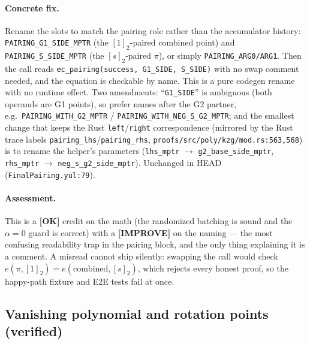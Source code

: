 \paragraph{Concrete fix.}
Rename the slots to match the pairing role rather than the
accumulator history: \texttt{PAIRING\_\allowbreak{}G1\_\allowbreak{}SIDE\_\allowbreak{}MPTR} (the
$[1]_2$-paired combined point) and \texttt{PAIRING\_\allowbreak{}S\_\allowbreak{}SIDE\_\allowbreak{}MPTR}
(the $[s]_2$-paired $\pi$), or simply
\texttt{PAIRING\_\allowbreak{}ARG0/\allowbreak{}ARG1}. Then the call reads
\texttt{ec\_\allowbreak{}pairing(success, G1\_\allowbreak{}SIDE, S\_\allowbreak{}SIDE)} with no swap
comment needed, and the equation is checkable by name. This is a
pure codegen rename with no runtime effect. Two amendments:
``\texttt{G1\_SIDE}'' is ambiguous (both operands are G1 points),
so prefer names after the G2 partner, e.g.\
\texttt{PAIRING\_\allowbreak{}WITH\_\allowbreak{}G2\_\allowbreak{}MPTR} / \texttt{PAIRING\_\allowbreak{}WITH\_\allowbreak{}NEG\_\allowbreak{}S\_\allowbreak{}G2\_\allowbreak{}MPTR};
and the smallest change that keeps the Rust \texttt{left}/\texttt{right}
correspondence (mirrored by the Rust trace labels
\texttt{pairing\_lhs}/\texttt{pairing\_rhs},
\texttt{proofs/\allowbreak{}src/\allowbreak{}poly/\allowbreak{}kzg/\allowbreak{}mod.rs:563,568}) is to rename the
helper's parameters (\texttt{lhs\_mptr} $\to$ \texttt{g2\_\allowbreak{}base\_\allowbreak{}side\_\allowbreak{}mptr},
\texttt{rhs\_mptr} $\to$ \texttt{neg\_\allowbreak{}s\_\allowbreak{}g2\_\allowbreak{}side\_\allowbreak{}mptr}).
\vstatus{OPEN} Unchanged in HEAD (\texttt{FinalPairing.yul:79}).

\paragraph{Assessment.} This is a
\textcolor{tracegreen}{\textbf{[OK]}} credit on the math (the
randomized batching is sound and the $\alpha{=}0$ guard is
correct) with a
\textcolor{codegenblue}{\textbf{[IMPROVE]}} on the naming ---
the most confusing readability trap in the pairing block, and the
only thing explaining it is a comment. \vstatus{CORRECTED} A
misread cannot ship silently: swapping the call would check
$e(\pi,[1]_2)=e(\text{combined},[s]_2)$, which rejects every honest
proof, so the happy-path fixture and E2E tests fail at once.

\subsection{Vanishing polynomial and rotation points (verified)}
\label{sec:pr-vanishing}


